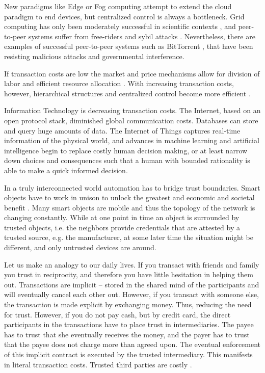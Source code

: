 New paradigms like Edge or Fog computing \parencite{Bonomi:2012:FCR:2342509.2342513,Yi:2015:SFC:2757384.2757397} attempt to extend the cloud paradigm to end devices, but centralized control is always a bottleneck. Grid computing has only been moderately successful in scientific contexts \parencite{Anderson:2002:SEP:581571.581573,Beberg2009Folding}, and peer-to-peer systems \parencite{Rodrigues:2010:PS:1831407.1831427} suffer from free-riders \parencite{10.2307/3003400} and sybil attacks \parencite{douceur2002sybil}. Nevertheless, there are examples of successful peer-to-peer systems such as BitTorrent \parencite{cohen2003incentives}, that have been resisting malicious attacks and governmental interference.

If transaction costs are low the market and price mechanisms allow for division of labor and efficient resource allocation \parencite{smith1887inquiry}. With increasing transaction costs, however, hierarchical structures and centralized control become more efficient \parencite{ECCA:ECCA386}. 

Information Technology is decreasing transaction costs. The Internet, based on an open protocol stack, diminished global communication costs. Databases can store and query huge amounts of data. The Internet of Things captures real-time information of the physical world, and advances in machine learning and artificial intelligence begin to replace costly human decision making, or at least narrow down choices and consequences such that a human with bounded rationality \parencite{simon1982models} is able to make a quick informed decision. 

In a truly interconnected world automation has to bridge trust boundaries. Smart objects have to work in unison to unlock the greatest and economic and societal benefit \parencite{manyika2015unlocking}.
Many smart objects are mobile and thus the topology of the network is changing constantly. While at one point in time an object is surrounded by trusted objects, i.e. the neighbors provide credentials that are attested by a trusted source, e.g. the manufacturer, at some later time the situation might be different, and only untrusted devices are around. 

Let us make an analogy to our daily lives. If you transact with friends and family you trust in reciprocity, and therefore you have little hesitation in helping them out. Transactions are implicit -- stored in the shared mind of the participants and will eventually cancel each other out. However, if you transact with someone else, the transaction is made explicit by exchanging money. Thus, reducing the need for trust. However, if you do not pay cash, but by credit card, the direct participants in the transactions have to place trust in intermediaries. The payee has to trust that she eventually receives the money, and the payer has to trust that the payee does not charge more than agreed upon. The eventual enforcement of this implicit contract is executed by the trusted intermediary. This manifests in literal transaction costs. Trusted third parties are costly \parencite{szabo2005trusted}.

